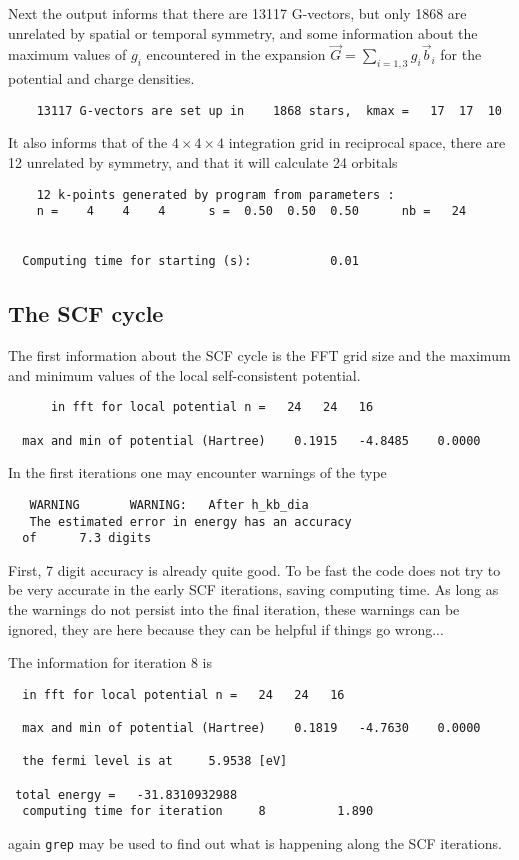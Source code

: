 \documentclass[11pt]{article}
\begin{document}
Next the output informs that there are 13117 G-vectors, but only 1868 are unrelated by spatial or temporal
symmetry, and some information about the maximum values of $g_i$ encountered in the expansion
$\vec G = \sum_{i=1,3} g_i \vec b_i$ for the potential and charge densities.
\begin{verbatim}
    13117 G-vectors are set up in    1868 stars,  kmax =   17  17  10
\end{verbatim}
It also informs that of the $4 \times 4 \times 4$ integration grid in
reciprocal space, there are 12 unrelated by symmetry, and that it will
calculate 24 orbitals
\begin{verbatim}
    12 k-points generated by program from parameters :
    n =    4    4    4      s =  0.50  0.50  0.50      nb =   24


  Computing time for starting (s):           0.01
\end{verbatim}

\subsection{The SCF cycle}

The first information about the SCF cycle is the FFT grid size and the maximum and
minimum values of the local self-consistent potential.
\begin{verbatim}
      in fft for local potential n =   24   24   16

  max and min of potential (Hartree)    0.1915   -4.8485    0.0000
\end{verbatim}
In the first iterations one may encounter warnings of the type
\begin{verbatim}
   WARNING       WARNING:   After h_kb_dia
   The estimated error in energy has an accuracy
  of      7.3 digits
\end{verbatim}
First, 7 digit accuracy is already quite good.  To be fast the code does not
try to be very accurate in the early SCF iterations, saving computing time.
As long as the warnings do not persist into the final iteration, these
warnings can be ignored, they are here because they can be helpful if
things go wrong...

The information for iteration 8 is
\begin{verbatim}
  in fft for local potential n =   24   24   16

  max and min of potential (Hartree)    0.1819   -4.7630    0.0000

  the fermi level is at     5.9538 [eV]

 total energy =   -31.8310932988
  computing time for iteration     8          1.890
\end{verbatim}
again {\tt grep} may be used to find out what is happening along the SCF iterations.
\end{document}
